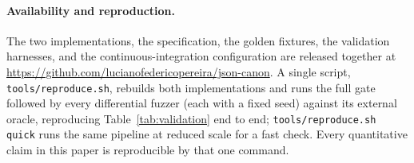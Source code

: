\documentclass[11pt]{article}
\newcommand{\code}[1]{\texttt{#1}}
\begin{document}
\paragraph{Availability and reproduction.}
The two implementations, the specification, the golden fixtures, the validation
harnesses, and the continuous-integration configuration are released together at
\url{https://github.com/lucianofedericopereira/json-canon}. A
single script, \code{tools/reproduce.sh}, rebuilds both implementations and runs
the full gate followed by every differential fuzzer (each with a fixed seed)
against its external oracle, reproducing Table~\ref{tab:validation} end to end;
\code{tools/reproduce.sh quick} runs the same pipeline at reduced scale for a
fast check. Every quantitative claim in this paper is reproducible by that one
command.



\end{document}
